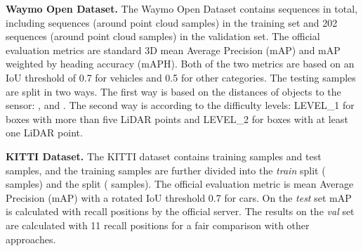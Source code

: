 \documentclass[10pt,twocolumn,letterpaper]{article}
\begin{document}
\begin{table*}[]
\setlength{\belowcaptionskip}{10pt}
\caption{Performance comparison on the Waymo Open Dataset \textit{test} leaderboard for the vehicle detection. : test submissions are the modified version of original architectures. : We append another frame following~\cite{shi2020pv} and use a larger voxel backbone.} \label{table_waymo_2}
\vspace{-4mm}
\end{table*}

\noindent\textbf{Waymo Open Dataset.} The Waymo Open Dataset contains  sequences in total, including  sequences (around  point cloud samples) in the training set and 202 sequences (around  point cloud samples) in the validation set. The official evaluation metrics are standard 3D mean Average Precision (mAP) and mAP weighted by heading accuracy (mAPH). Both of the two metrics are based on an IoU threshold of 0.7 for vehicles and 0.5 for other categories. The testing samples are split in two ways. The first way is based on the distances of objects to the sensor: ,  and . The second way is according to the difficulty levels: LEVEL\_1 for boxes with more than five LiDAR points and LEVEL\_2 for boxes with at least one LiDAR point.

\noindent\textbf{KITTI Dataset.} The KITTI dataset contains  training samples and  test samples, and the training samples are further divided into the \textit{train} split ( samples) and the  split ( samples). The official evaluation metric is mean Average Precision (mAP) with a rotated IoU threshold 0.7 for cars. On the \textit{test} set mAP is calculated with  recall positions by the official server. The results on the \textit{val} set are calculated with 11 recall positions for a fair comparison with other approaches.
\end{document}
